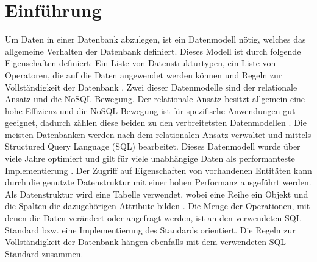 
\chapter{Einführung} %

\label{Kaptiel1} %


\newcommand{\keyword}[1]{\textit{#1}}
\newcommand{\tabhead}[1]{\textbf{#1}}
\newcommand{\code}[1]{\texttt{#1}}
\newcommand{\file}[1]{\texttt{\bfseries#1}}
\newcommand{\option}[1]{\texttt{\itshape#1}}

Um Daten in einer Datenbank abzulegen, ist ein Datenmodell nötig, welches das allgemeine Verhalten der Datenbank definiert. Dieses Modell ist durch folgende Eigenschaften definiert: Ein Liste von Datenstrukturtypen, ein Liste von Operatoren, die auf die Daten angewendet werden können und Regeln zur Vollständigkeit der Datenbank \parencite{codd1981data}. Zwei dieser Datenmodelle sind der relationale Ansatz und die NoSQL-Bewegung. Der relationale Ansatz besitzt  allgemein eine hohe Effizienz und die NoSQL-Bewegung ist für spezifische Anwendungen gut geeignet, dadurch zählen diese  beiden zu den verbreitetsten Datenmodellen  \parencite{vicknair2010comparison}. \newline
Die meisten Datenbanken werden nach dem relationalen Ansatz verwaltet und mittels Structured Query Language (SQL) bearbeitet. Dieses Datenmodell wurde über viele Jahre optimiert und gilt für viele unabhängige Daten als performanteste Implementierung \parencite{miller2013graph}. Der Zugriff auf Eigenschaften von vorhandenen Entitäten kann durch die genutzte Datenstruktur mit einer hohen Performanz ausgeführt werden. Als Datenstruktur wird eine Tabelle verwendet, wobei eine Reihe ein Objekt  und die Spalten die dazugehörigen Attribute bilden \parencite{tatarinov2002storing}. Die Menge der Operationen, mit denen die Daten verändert oder angefragt werden, ist an den verwendeten SQL-Standard bzw. eine Implementierung des Standards orientiert. Die Regeln zur Vollständigkeit der Datenbank hängen ebenfalls mit dem verwendeten SQL-Standard zusammen.  \newline 
